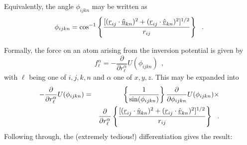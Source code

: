 Equivalently, the angle $\phi_{ijkn}$ may be written as
\begin{equation}
\phi_{ijkn} = \cos^{-1} \left\{ \frac{ [
(\mbox{$\underline{r}$}_{ij}\cdot\mbox{$\underline{\hat{u}}$}_{kn})^{2} +
(\mbox{$\underline{r}$}_{ij}\cdot\mbox{$\underline{\hat{v}}$}_{kn})^{2}
]^{1/2}}{r_{ij}} \right\}~~.
\end{equation}

Formally, the force on an atom arising from the
inversion potential is given by
\begin{equation}
f_{\ell}^{\alpha} = -\frac{\partial}{\partial
r_{\ell}^{\alpha}}U(\phi_{ijkn})~~,
\end{equation}
with $\ell$ being one of $i,j,k,n$ and $\alpha$ one of $x,y,z$.
This may be expanded into
\begin{eqnarray}
-\frac{\partial}{\partial r_{\ell}^{\alpha}}U(\phi_{ijkn})&=&
\left\{ \frac{1}{\sin(\phi_{ijkn})} \right\}
\frac{\partial}{\partial \phi_{ijkn}}U(\phi_{ijkn})\times \nonumber \\
& & \frac{\partial}{\partial r_{\ell}^{\alpha}} \left\{
\frac{[(\mbox{$\underline{r}$}_{ij}\cdot\mbox{$\underline{\hat{u}}$}_{kn})^{2}
+(\mbox{$\underline{r}$}_{ij}\cdot\mbox{$\underline{\hat{v}}$}_{kn})^{2}]^{1/2}} {r_{ij}}
\right\}~~.
\end{eqnarray}
Following through, the (extremely tedious!) differentiation gives
the result:
